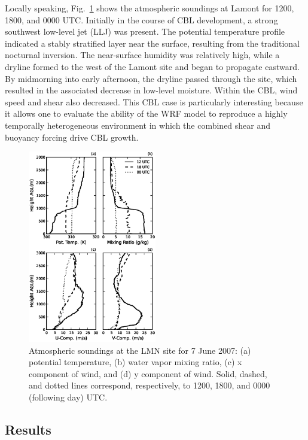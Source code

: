 Locally speaking, Fig.~\ref{figure403} shows the atmospheric soundings at Lamont for 1200, 1800, and 0000 UTC. Initially in the course of CBL development, a strong southwest low-level jet (LLJ) was present. The potential temperature profile indicated a stably stratified layer near the surface, resulting from the traditional nocturnal inversion. The near-surface humidity was relatively high, while a dryline formed to the west of the Lamont site and began to propagate eastward. By midmorning into early afternoon, the dryline passed through the site, which resulted in the associated decrease in low-level moisture. Within the CBL, wind speed and shear also decreased. This CBL case is particularly interesting because it allows one to evaluate the ability of the WRF model to reproduce a highly temporally heterogeneous environment in which the combined shear and buoyancy forcing drive CBL growth.


\begin{figure}[H]
\begin{center}
\includegraphics[width=0.5\textwidth]{figures/chapter4/20070607_lmnsounding}
\end{center}
\caption{Atmospheric soundings at the LMN site for 7 June 2007: (a) potential temperature, (b) water vapor mixing ratio, (c) x component of wind, and (d) y component of wind. Solid, dashed, and dotted lines correspond, respectively, to 1200, 1800, and 0000 (following day) UTC.}
\label{figure403}
\end{figure}


\subsection{Results}
\label{res-432}

